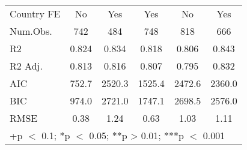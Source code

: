 \begin{table}
\begin{tabular}[t]{lccccc}
\midrule
Country FE & No & Yes & Yes & No & Yes\\
Num.Obs. & 742 & 484 & 748 & 818 & 666\\
R2 & 0.824 & 0.834 & 0.818 & 0.806 & 0.843\\
R2 Adj. & 0.813 & 0.816 & 0.807 & 0.795 & 0.832\\
AIC & 752.7 & 2520.3 & 1525.4 & 2472.6 & 2360.0\\
BIC & 974.0 & 2721.0 & 1747.1 & 2698.5 & 2576.0\\
RMSE & 0.38 & 1.24 & 0.63 & 1.03 & 1.11\\
\bottomrule
\multicolumn{6}{l}{\rule{0pt}{1em}+p $<$ 0.1; *p $<$ 0.05; **p > 0.01; ***p $<$ 0.001}\\
\end{tabular}
\end{table}
